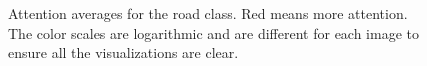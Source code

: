 \begin{figure}[ht]
{	}
	\caption[Road attention averages]{
		Attention averages for the road class. Red means more attention. The color
		scales are logarithmic and are different for each image to ensure all the visualizations
		are clear.
		}
\end{figure}
\label{fig:average_road}
